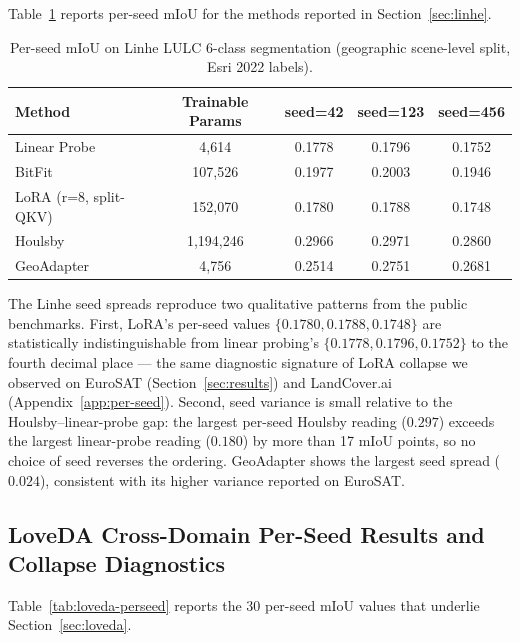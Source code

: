 Table~\ref{tab:linhe-perseed} reports per-seed mIoU for the methods reported in Section~\ref{sec:linhe}.

\begin{table}[h]
\centering
\small
\caption{Per-seed mIoU on Linhe LULC 6-class segmentation (geographic scene-level split, Esri 2022 labels).}
\label{tab:linhe-perseed}
\begin{tabular}{lcccc}
\toprule
Method & Trainable Params & seed=42 & seed=123 & seed=456 \\
\midrule
Linear Probe & 4{,}614       & 0.1778 & 0.1796 & 0.1752 \\
BitFit       & 107{,}526     & 0.1977 & 0.2003 & 0.1946 \\
LoRA (r=8, split-QKV) & 152{,}070 & 0.1780 & 0.1788 & 0.1748 \\
Houlsby      & 1{,}194{,}246 & 0.2966 & 0.2971 & 0.2860 \\
GeoAdapter   & 4{,}756       & 0.2514 & 0.2751 & 0.2681 \\
\bottomrule
\end{tabular}
\end{table}

The Linhe seed spreads reproduce two qualitative patterns from the public benchmarks. First, LoRA's per-seed values $\{0.1780, 0.1788, 0.1748\}$ are statistically indistinguishable from linear probing's $\{0.1778, 0.1796, 0.1752\}$ to the fourth decimal place --- the same diagnostic signature of LoRA collapse we observed on EuroSAT (Section~\ref{sec:results}) and LandCover.ai (Appendix~\ref{app:per-seed}). Second, seed variance is small relative to the Houlsby--linear-probe gap: the largest per-seed Houlsby reading ($0.297$) exceeds the largest linear-probe reading ($0.180$) by more than 17 mIoU points, so no choice of seed reverses the ordering. GeoAdapter shows the largest seed spread ($0.024$), consistent with its higher variance reported on EuroSAT.

\subsection{LoveDA Cross-Domain Per-Seed Results and Collapse Diagnostics}
\label{app:loveda-perclass}

Table~\ref{tab:loveda-perseed} reports the 30 per-seed mIoU values that underlie Section~\ref{sec:loveda}.

